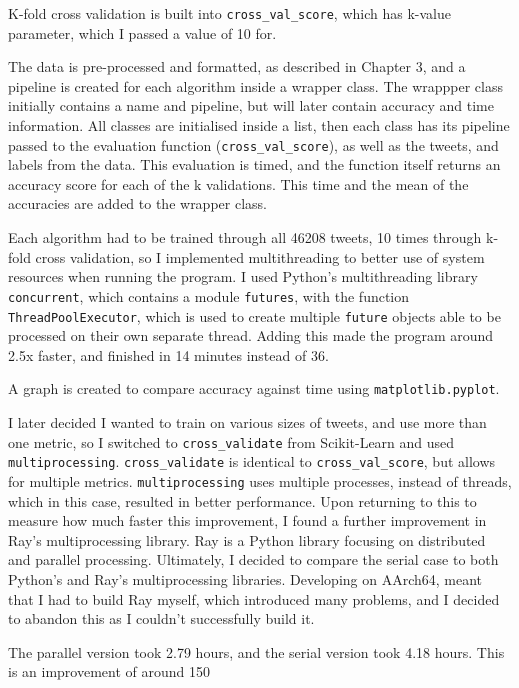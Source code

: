 \documentclass{article}
\begin{document}
K-fold cross validation is built into \lstinline{cross_val_score}, which has k-value parameter, which I passed a value of 10 for.

The data is pre-processed and formatted, as described in Chapter 3, and a pipeline is created for each algorithm inside a wrapper class.
The wrappper class initially contains a name and pipeline, but will later contain accuracy and time information.
All classes are initialised inside a list, then each class has its pipeline passed to the evaluation function (\lstinline{cross_val_score}), as well as the tweets, and labels from the data.
This evaluation is timed, and the function itself returns an accuracy score for each of the k validations.
This time and the mean of the accuracies are added to the wrapper class.

Each algorithm had to be trained through all 46208 tweets, 10 times through k-fold cross validation, so I implemented multithreading to better use of system resources when running the program.
I used Python's multithreading library \lstinline{concurrent}, which contains a module \lstinline{futures}, with the function \lstinline{ThreadPoolExecutor}, which is used to create multiple \lstinline{future} objects able to be processed on their own separate thread.
Adding this made the program around 2.5x faster, and finished in 14 minutes instead of 36.

A graph is created to compare accuracy against time using \lstinline{matplotlib.pyplot}.

I later decided I wanted to train on various sizes of tweets, and use more than one metric, so I switched to \lstinline{cross_validate} from Scikit-Learn and used \lstinline{multiprocessing}.
\lstinline{cross_validate} is identical to \lstinline{cross_val_score}, but allows for multiple metrics.
\lstinline{multiprocessing} uses multiple processes, instead of threads, which in this case, resulted in better performance.
Upon returning to this to measure how much faster this improvement, I found a further improvement in Ray's multiprocessing library.
Ray is a Python library focusing on distributed and parallel processing.
Ultimately, I decided to compare the serial case to both Python's and Ray's multiprocessing libraries.
Developing on AArch64, meant that I had to build Ray myself, which introduced many problems, and I decided to abandon this as I couldn't successfully build it.

The parallel version took 2.79 hours, and the serial version took 4.18 hours.
This is an improvement of around 150%
\end{document}
